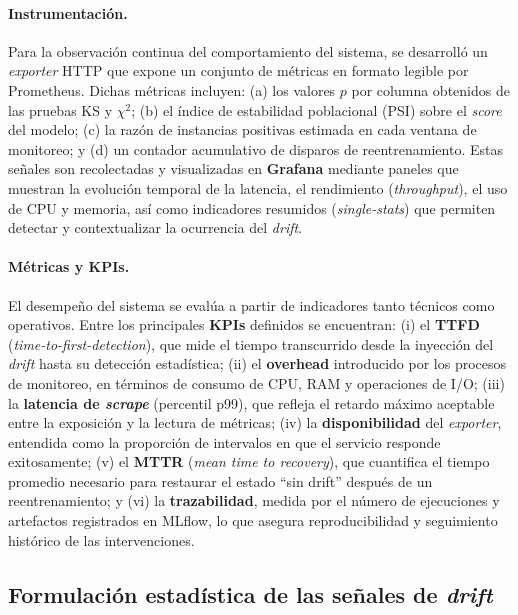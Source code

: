 \paragraph{Instrumentación.}  
Para la observación continua del comportamiento del sistema, se desarrolló un \textit{exporter} HTTP que expone un conjunto de métricas en formato legible por Prometheus. Dichas métricas incluyen: (a) los valores $p$ por columna obtenidos de las pruebas KS y $\chi^2$; (b) el índice de estabilidad poblacional (PSI) sobre el \textit{score} del modelo; (c) la razón de instancias positivas estimada en cada ventana de monitoreo; y (d) un contador acumulativo de disparos de reentrenamiento.  
Estas señales son recolectadas y visualizadas en \textbf{Grafana} mediante paneles que muestran la evolución temporal de la latencia, el rendimiento (\textit{throughput}), el uso de CPU y memoria, así como indicadores resumidos (\textit{single-stats}) que permiten detectar y contextualizar la ocurrencia del \textit{drift}.

\paragraph{Métricas y KPIs.}  
El desempeño del sistema se evalúa a partir de indicadores tanto técnicos como operativos. Entre los principales \textbf{KPIs} definidos se encuentran:  
(i) el \textbf{TTFD} (\textit{time-to-first-detection}), que mide el tiempo transcurrido desde la inyección del \textit{drift} hasta su detección estadística;  
(ii) el \textbf{overhead} introducido por los procesos de monitoreo, en términos de consumo de CPU, RAM y operaciones de I/O;  
(iii) la \textbf{latencia de \textit{scrape}} (percentil p99), que refleja el retardo máximo aceptable entre la exposición y la lectura de métricas;  
(iv) la \textbf{disponibilidad} del \textit{exporter}, entendida como la proporción de intervalos en que el servicio responde exitosamente;  
(v) el \textbf{MTTR} (\textit{mean time to recovery}), que cuantifica el tiempo promedio necesario para restaurar el estado “sin drift” después de un reentrenamiento; y  
(vi) la \textbf{trazabilidad}, medida por el número de ejecuciones y artefactos registrados en MLflow, lo que asegura reproducibilidad y seguimiento histórico de las intervenciones.

\subsection{Formulación estadística de las señales de \textit{drift}}

